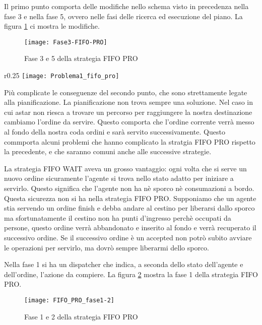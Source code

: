 Il primo punto comporta delle modifiche nello schema visto in precedenza nella fase 3 e nella fase 5, ovvero nelle fasi delle ricerca ed esecuzione del piano. La figura \ref{fig:figure3} ci mostra le modifiche.

\begin{figure}[htp]
  \texttt{[image: Fase3-FIFO-PRO]}
  \caption{Fase 3 e 5 della strategia FIFO PRO}
  \label{fig:figure3}
\end{figure}

\newpage
\begin{wrapfigure}{r}{0.25\textwidth} 
    \centering
    \texttt{[image: Problema1\_fifo\_pro]}
\end{wrapfigure}

Più complicate le conseguenze del secondo punto, che sono strettamente legate alla pianificazione. La pianificazione non trova sempre una soluzione. Nel caso in cui astar non riesca a trovare un percorso per raggiungere la nostra destinazione cambiamo l'ordine da servire. Questo comporta che l'ordine corrente verrà messo al fondo della nostra coda ordini e sarà servito successivamente. Questo commporta alcuni problemi che hanno complicato la stratgia FIFO PRO rispetto la precedente, e che saranno comuni anche alle successive strategie. 

La strategia FIFO WAIT aveva un grosso vantaggio: ogni volta che si serve un nuovo ordine sicuramente l'agente si trova nello stato adatto per iniziare a servirlo. 
Questo significa che l'agente non ha nè sporco nè consumazioni a bordo. Questa sicurezza non si ha nella strategia FIFO PRO. Supponiamo che un agente stia servendo un ordine finish e debba andare al cestino per liberarsi dallo sporco ma sfortunatamente il cestino non ha punti d'ingresso perchè occupati da persone, questo ordine verrà abbandonato e inserito al fondo e verrà recuperato il successivo ordine. Se il successivo ordine è un accepted non potrò subito avviare le operazioni per servirlo, ma dovrò sempre liberarmi dello sporco.

Nella fase 1 si ha un dispatcher che indica, a seconda dello stato dell'agente e dell'ordine, l'azione da compiere. La figura \ref{fig:figure4} mostra la fase 1 della strategia FIFO PRO.

\begin{figure}[htp]
  \texttt{[image: FIFO\_PRO\_fase1-2]}
  \caption{Fase 1 e 2 della strategia FIFO PRO}
  \label{fig:figure4}
\end{figure}

